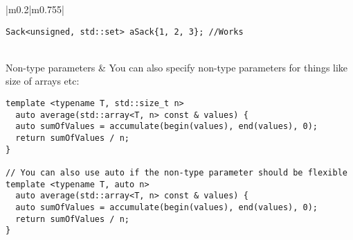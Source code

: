 \documentclass[main.tex,fontsize=8pt,paper=a4,paper=portrait,DIV=calc,]{scrartcl}
\begin{document}
\begin{table}[ht!]
\begin{tabular}{|m{0.2\linewidth}|m{0.755\linewidth}|}
\begin{lstlisting}
Sack<unsigned, std::set> aSack{1, 2, 3}; //Works
\end{lstlisting}\\
\hline
Non-type parameters & 
You can also specify non-type parameters for things like size of arrays etc:\newline
\begin{lstlisting}
template <typename T, std::size_t n>
  auto average(std::array<T, n> const & values) {
  auto sumOfValues = accumulate(begin(values), end(values), 0);
  return sumOfValues / n;
}

// You can also use auto if the non-type parameter should be flexible
template <typename T, auto n>
  auto average(std::array<T, n> const & values) {
  auto sumOfValues = accumulate(begin(values), end(values), 0);
  return sumOfValues / n;
}
\end{lstlisting}\\
\hline
\end{tabular}
\end{table}
\pagebreak
\begin{table}[ht!]
\begin{tabular}{|m{0.2\linewidth}|m{0.755\linewidth}|}
\hline
\end{tabular}
\end{table}
\pagebreak
\end{document}
